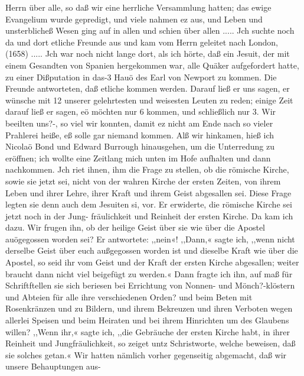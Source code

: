 Herrn über alle, so daß wir eine herrliche Versammlung hatten;
das ewige Evangelium wurde gepredigt, und viele nahmen ez
aus, und Leben und unsterblicheß Wesen ging auf in allen und
schien über allen .....
Jch suchte noch da und dort etliche Freunde aus und kam
vom Herrn geleitet nach London, (1658) .....
Jch war noch nicht lange dort, als ich hörte, daß ein Jesuit,
der mit einem Gesandten von Spanien hergekommen war, alle
Quäker aufgefordert hatte, zu einer Dißputation in das-3 Hauö des
Earl von Newport zu kommen. Die Freunde antworteten, daß
etliche kommen werden. Darauf ließ er uns sagen, er wünsche
mit 12 unserer gelehrtesten und weisesten Leuten zu reden; einige
Zeit darauf ließ er sagen, eö möchten nur 6 kommen, und schließlich
nur 3. Wir beeilten uns?-, so viel wir konnten, damit ez nicht am
Ende nach so vieler Prahlerei heiße, eß solle gar niemand kommen.
Alß wir hinkamen, hieß ich Nicolaö Bond und Edward Burrough
hinausgehen, um die Unterredung zu eröffnen; ich wollte eine
Zeitlang mich unten im Hofe aufhalten und dann nachkommen.
Jch riet ihnen, ihm die Frage zu stellen, ob die römische Kirche,
sowie sie jetzt sei, nicht von der wahren Kirche der ersten Zeiten,
von ihrem Leben und ihrer Lehre, ihrer Kraft und ihrem Geist
abgesallen sei. Diese Frage legten sie denn auch dem Jesuiten si,
vor. Er erwiderte, die römische Kirche sei jetzt noch in der Jung-
fräulichkeit und Reinheit der ersten Kirche. Da kam ich dazu.
Wir frugen ihn, ob der heilige Geist über sie wie über die Apostel
auögegossen worden sei? Er antwortete: ,,nein«! ,,Dann,« sagte
ich, ,,wenn nicht derselbe Geist über euch außgegossen worden ist
und dieselbe Kraft wie über die Apostel, so seid ihr vom Geist
und der Kraft der ersten Kirche abgesallen; weiter braucht dann
nicht viel beigefügt zu werden.« Dann fragte ich ihn, auf maß
für Schriftftellen sie sich beriesen bei Errichtung von Nonnen- und
Mönch?-klöstern und Abteien für alle ihre verschiedenen Orden?
und beim Beten mit Rosenkränzen und zu Bildern, und ihrem
Bekreuzen und ihren Verboten wegen allerlei Speisen und beim
Heiraten und bei ihrem Hinrichten um des Glaubens willen?
,,Wenn ihr,« sagte ich, ,,die Gebräuche der ersten Kirche habt, in
ihrer Reinheit und Jungfräulichkeit, so zeiget untz Schristworte,
welche beweisen, daß sie solches getan.« Wir hatten nämlich
vorher gegenseitig abgemacht, daß wir unsere Behauptungen aus-


